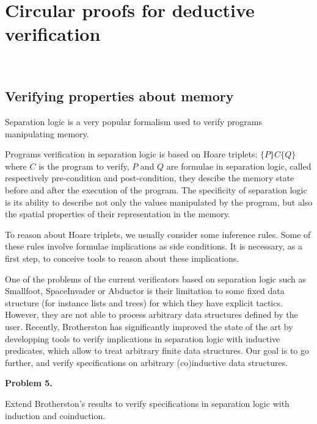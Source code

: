 \documentclass{article}
\begin{document}
\section{Circular proofs for deductive verification}~\label{CircForVerif}


\subsection{Verifying properties about memory}

Separation logic \cite{Reynolds2002} is a very popular formalism used to verify programs manipulating memory.

Programs verification in separation logic is based on Hoare triplets: $\{P\} C \{Q\}$ where $C$ is the program to verify, $P$ and $Q$ are formulae in separation logic, called respectively pre-condition and post-condition, they descibe the memory state before and after the execution of the program. The specificity of separation logic is its ability to describe not only the values manipulated by the program, but also the spatial properties of their representation in the memory. 

To reason about Hoare triplets, we usually consider some inference rules. Some of these rules 
involve formulae implications as side conditions. It is necessary, as a first step, to conceive tools to reason about these implications.

One of the problems of the current verificators based on separation logic such as Smallfoot\cite{BerdineCO05},
SpaceInvader \cite{DistefanoOY06} or Abductor \cite{CalcagnoDOY11} is their limitation to some fixed data structure (for instance lists and trees) for which they have explicit tactics. However, they are not able to process arbitrary data structures defined by the user. Recently, Brotherston has significantly improved the state of the art by developping tools to verify implications in separation logic with inductive predicates, which allow to treat 
arbitrary finite data structures. Our goal is to go further, and verify specifications on arbitrary (co)inductive data structures. 


\begin{center}
\begin{bclogo}[logo= ,arrondi = 0.1, couleur = green!10,  epBarre = 0]{}
  \vspace{-10pt}
  \textbf{Problem 5.}
  
  Extend Brotherston's results to verify specifications in separation logic with induction and coinduction.
\end{bclogo}
\end{center}
\end{document}
